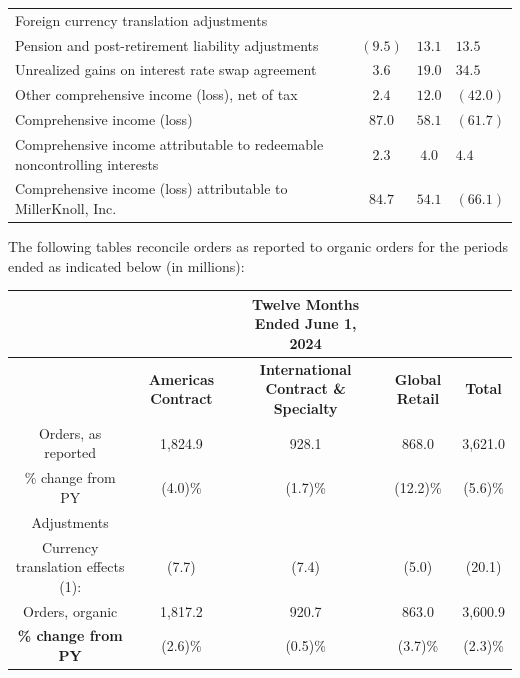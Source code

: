 \begin{tabular}{|l|c|c|c|}
Foreign currency translation adjustments & & & & \\
Pension and post-retirement liability adjustments & & $(9.5)$ & $13.1$ & $13.5$ \\
Unrealized gains on interest rate swap agreement & & $3.6$ & $19.0$ & $34.5$ \\
Other comprehensive income (loss), net of tax & & $2.4$ & $12.0$ & $(42.0)$ \\
\hline
Comprehensive income (loss) & & $87.0$ & $58.1$ & $(61.7)$ \\
Comprehensive income attributable to redeemable noncontrolling interests & & $2.3$ & $4.0$ & $4.4$ \\
\hline
Comprehensive income (loss) attributable to MillerKnoll, Inc. & & $84.7$ & $54.1$ & $(66.1)$ \\
\hline
\end{tabular}

The following tables reconcile orders as reported to organic orders for the periods ended as indicated below (in millions):

\begin{tabular}{|c|c|c|c|c|}
&&Twelve Months Ended June 1, 2024&& \\    
\hline
&\textbf{Americas Contract} & \textbf{International Contract \& Specialty} & \textbf{Global Retail} & \textbf{Total} \\
\hline
Orders, as reported&1,824.9 & 928.1 & 868.0 & 3,621.0 \\
\hline
\% change from PY&(4.0)\%&(1.7)\%&(12.2)\%&(5.6)\%\\
Adjustments&&&&\\
Currency translation effects (1):& (7.7)& (7.4)& (5.0)&(20.1)\\
\hline
Orders, organic& 1,817.2& 920.7&863.0&3,600.9\\
\hline
\textbf{\% change from PY}&(2.6)\%& (0.5)\%&(3.7)\%&(2.3)\%\\

\end{tabular}

